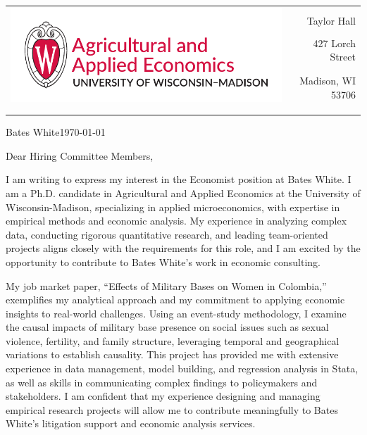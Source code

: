 \documentclass[12pt]{letter}
\begin{document}
\begin{tabularx}{\textwidth}{Xr}
\multirow{4}{*}{\includegraphics[height=3\baselineskip]{logo_cropped.pdf}} &  \\
& Taylor Hall \\
& 427 Lorch Street \\
& Madison, WI 53706 \\
[-1.8ex]\\
\\
\end{tabularx}

\newcommand{\compName}{Bates White}
\newcommand{\posName}{Economist}

\compName \hfill \today \\

\medskip

Dear Hiring Committee Members,

I am writing to express my interest in the \posName \vspace{1mm} position at \compName. 
I am a Ph.D. candidate in Agricultural and Applied Economics at the University of Wisconsin-Madison, specializing in applied microeconomics, 
with expertise in empirical methods and economic analysis. My experience in analyzing complex data, conducting rigorous quantitative research, 
and leading team-oriented projects aligns closely with the requirements for this role, and I am excited by the opportunity to contribute 
to \compName's work in economic consulting.

My job market paper, “Effects of Military Bases on Women in Colombia,” exemplifies my analytical approach and my commitment to 
applying economic insights to real-world challenges. Using an event-study methodology, I examine the causal impacts of military base presence 
on social issues such as sexual violence, fertility, and family structure, leveraging temporal and geographical variations to establish causality. 
This project has provided me with extensive experience in data management, model building, and regression analysis in Stata, as well as skills 
in communicating complex findings to policymakers and stakeholders. I am confident that my experience designing and managing empirical research projects 
will allow me to contribute meaningfully to \compName's litigation support and economic analysis services.
\end{document}
